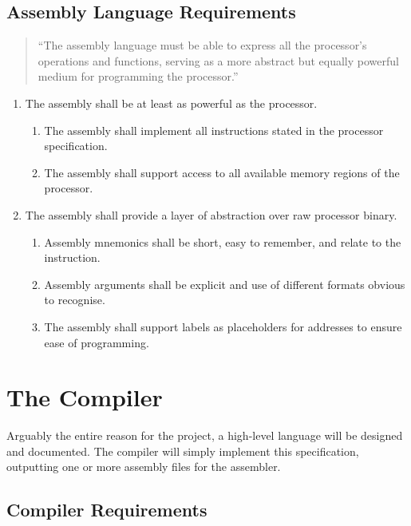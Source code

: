 \documentclass{article}
\begin{document}
\subsection{Assembly Language Requirements}

\begin{quote}
    ``The assembly language must be able to express all the processor's operations and functions, serving as a more abstract but equally powerful medium for programming the processor.''
\end{quote}

\begin{enumerate}[label=R\arabic*]
    \item The assembly shall be at least as powerful as the processor.
    \begin{enumerate}[label=\theenumi.\arabic*]
        \item The assembly shall implement all instructions stated in the processor specification.
        \item The assembly shall support access to all available memory regions of the processor.
    \end{enumerate}
    \item The assembly shall provide a layer of abstraction over raw processor binary.
    \begin{enumerate}[label=\theenumi.\arabic*]
        \item Assembly mnemonics shall be short, easy to remember, and relate to the instruction.
        \item Assembly arguments shall be explicit and use of different formats obvious to recognise.
        \item The assembly shall support labels as placeholders for addresses to ensure ease of programming.
    \end{enumerate}
\end{enumerate}

\section{The Compiler}

Arguably the entire reason for the project, a high-level language will be designed and documented.
The compiler will simply implement this specification, outputting one or more assembly files for the assembler.

\subsection{Compiler Requirements}
\end{document}
